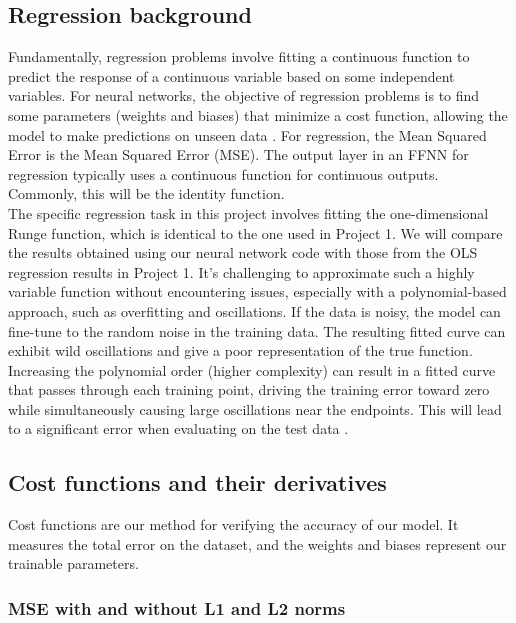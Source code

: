 \documentclass[amssymb,twocolumn,aps,floatfix]{revtex4-2}
\begin{document}
\subsection{Regression background}

Fundamentally, regression problems involve fitting a continuous function to predict the response of a continuous variable based on some independent variables. For neural networks, the objective of regression problems is to find some parameters (weights and biases) that minimize a cost function, allowing the model to make predictions on unseen data \cite{hj_week40}. For regression, the Mean Squared Error is the Mean Squared Error (MSE). The output layer in an FFNN for regression typically uses a continuous function for continuous outputs. Commonly, this will be the identity function.\\ 

The specific regression task in this project involves fitting the one-dimensional Runge function, which is identical to the one used in Project 1. We will compare the results obtained using our neural network code with those from the OLS regression results in Project 1. It's challenging to approximate such a highly variable function without encountering issues, especially with a polynomial-based approach, such as overfitting and oscillations. If the data is noisy, the model can fine-tune to the random noise in the training data. The resulting fitted curve can exhibit wild oscillations and give a poor representation of the true function. Increasing the polynomial order (higher complexity) can result in a fitted curve that passes through each training point, driving the training error toward zero while simultaneously causing large oscillations near the endpoints. This will lead to a significant error when evaluating on the test data \cite{wikipedia-runge}. 

\subsection{Cost functions and their derivatives}
\label{subsection:cost_theory}

Cost functions are our method for verifying the accuracy of our model. It measures the total error on the dataset, and the weights and biases represent our trainable parameters. 

\subsubsection{MSE with and without L1 and L2 norms}
\label{subsubsection:mse_theory}
\end{document}
